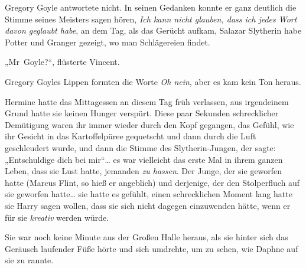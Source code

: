 Gregory Goyle antwortete nicht. In seinen Gedanken konnte er ganz deutlich die Stimme seines Meisters sagen hören, \emph{Ich kann nicht glauben, dass ich jedes Wort davon geglaubt habe}, an dem Tag, als das Gerücht aufkam, Salazar Slytherin habe Potter und Granger gezeigt, wo man Schlägereien findet.

„Mr~Goyle?“, flüsterte Vincent.

Gregory Goyles Lippen formten die Worte \emph{Oh nein}, aber es kam kein Ton heraus.

\later

Hermine hatte das Mittagessen an diesem Tag früh verlassen, aus irgendeinem Grund hatte sie keinen Hunger verspürt. Diese paar Sekunden schrecklicher Demütigung waren ihr immer wieder durch den Kopf gegangen, das Gefühl, wie ihr Gesicht in das Kartoffelpüree gequetscht und dann durch die Luft geschleudert wurde, und dann die Stimme des Slytherin-Jungen, der sagte: „Entschuldige dich bei mir“… es war vielleicht das erste Mal in ihrem ganzen Leben, dass sie Lust hatte, jemanden \emph{zu hassen}. Der Junge, der sie geworfen hatte (Marcus Flint, so hieß er angeblich) und derjenige, der den Stolperfluch auf sie geworfen hatte… sie hatte es gefühlt, einen schrecklichen Moment lang hatte sie Harry sagen wollen, dass sie sich nicht dagegen einzuwenden hätte, wenn er für sie \emph{kreativ} werden würde.

Sie war noch keine Minute aus der Großen Halle heraus, als sie hinter sich das Geräusch laufender Füße hörte und sich umdrehte, um zu sehen, wie Daphne auf sie zu rannte.

